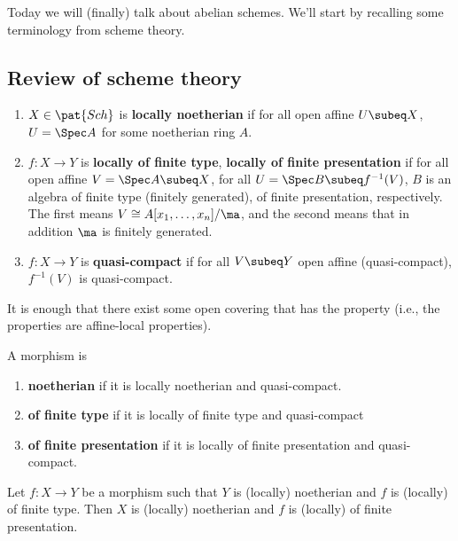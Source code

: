 
Today we will (finally) talk about abelian schemes. We'll start by recalling some terminology from scheme theory.

\subsection{Review of scheme theory}
\begin{df}
\begin{enumerate}
\item
$X\in \pat{Sch}$ is \textbf{locally noetherian} if for all open affine $U\subeq X$, $U=\Spec A$ for some noetherian ring $A$.
\item
$f:X\to Y$ is \textbf{locally of finite type}, \textbf{locally of finite presentation} if for all open affine $V=\Spec A\subeq X$, for all $U=\Spec B\subeq f^{-1}(V)$, $B$ is an algebra of finite type (finitely generated), of finite presentation, respectively.
The first means $V\cong A[x_1,\ldots, x_n]/\ma$, and the second means that in addition $\ma$ is finitely generated.
\item
$f:X\to Y$ is \textbf{quasi-compact} if for all $V\subeq Y$ open affine (quasi-compact), $f^{-1}(V)$ is quasi-compact.
\end{enumerate}
\end{df}
\begin{rem}It is enough that there exist some open covering that has the property (i.e., the properties are affine-local properties).
\end{rem}
\begin{df}
A morphism is
\begin{enumerate}
\item
\textbf{noetherian} if it is locally noetherian and quasi-compact.
\item
\textbf{of finite type} if it is locally of finite type and quasi-compact
\item
\textbf{of finite presentation} if it is locally of finite presentation and quasi-compact.
\end{enumerate}
\end{df}
\begin{pr}
Let $f:X\to Y$ be a morphism such that $Y$ is (locally) noetherian and $f$ is (locally) of finite type. Then $X$ is (locally) noetherian and $f$ is (locally) of finite presentation.
\end{pr}%
